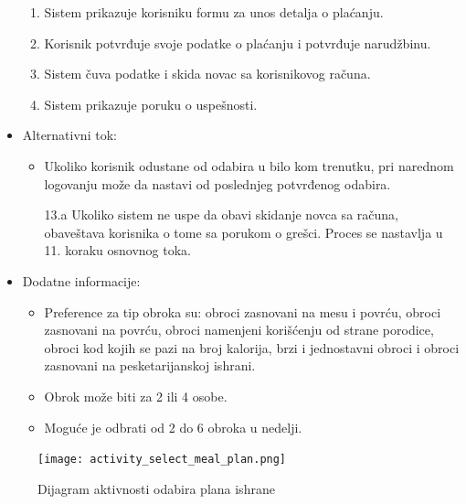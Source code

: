 \begin{itemize}
\begin{enumerate}
            \item Sistem prikazuje korisniku formu za unos detalja o plaćanju.
            \item Korisnik potvrđuje svoje podatke o plaćanju i potvrđuje narudžbinu.
            \item Sistem čuva podatke i skida novac sa korisnikovog računa.
            \item Sistem prikazuje poruku o uspešnosti. 
        \end{enumerate}
    \item Alternativni tok:
        \begin{itemize}
            \item Ukoliko korisnik odustane od odabira u bilo kom trenutku, pri narednom logovanju može da nastavi od poslednjeg potvrđenog odabira.
            \item[13.a] Ukoliko sistem ne uspe da obavi skidanje novca sa računa, obaveštava korisnika o tome sa porukom o grešci. Proces se nastavlja u 11. koraku osnovnog toka.
        \end{itemize}
    \item Dodatne informacije:
        \begin{itemize}
            \item Preference za tip obroka su: obroci zasnovani na mesu i povrću, obroci zasnovani na povrću, obroci namenjeni korišćenju od strane porodice, obroci kod kojih se pazi na broj kalorija, brzi i jednostavni obroci i obroci zasnovani na pesketarijanskoj ishrani. 
            \item Obrok može biti za 2 ili 4 osobe.
            \item Moguće je odbrati od 2 do 6 obroka u nedelji.
        \end{itemize}
\end{itemize}

\begin{figure}[H]
\begin{center}
\texttt{[image: activity\_select\_meal\_plan.png]}
\end{center}
    \caption{Dijagram aktivnosti odabira plana ishrane}
\label{fig:ActivitySelectMealPlan}
\end{figure}
